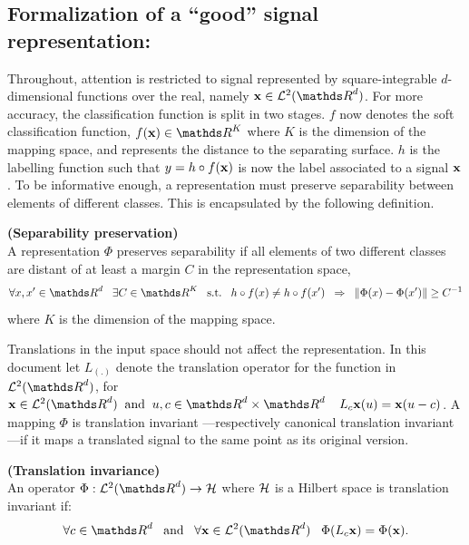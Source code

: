 \documentclass[a4paper,11pt]{report}
\begin{document}
      
		\subsection{Formalization of a ``good'' signal representation:}
      \label{sec:Intro/Signal rep/Formalization}
      
			Throughout, attention is restricted to signal represented by square-integrable $d$-dimensional functions over the real, namely $\bfx \in \mcalL^{2}(\dsR^{d})$. For more accuracy, the classification function is split in two stages. $f$ now denotes the soft classification function, \ie $f(\bfx) \in \dsR^{K}$ where $K$ is the dimension of the mapping space, and represents the distance to the separating surface. $h$ is the labelling function such that $y=h \circ f({\bf x})$ is now the label associated to a signal ${\bf x}$. To be informative enough, a representation must preserve separability between elements of different classes. This is encapsulated by the following definition.
      
			\begin{defn} \textbf{(Separability preservation)}\\
				A representation $\Phi$ preserves separability if all elements of two different classes are distant of at least a margin $C$ in the representation space,
				\begin{equation*}
					\forall x,x' \in \dsR^{d} \;\;\; \exists C \in \dsR^{K} \;\;\; \st \;\;\; h \circ f(x) \neq h \circ f(x') \;\; \Rightarrow \;\; \norm{\Phi(x)-\Phi(x')} \geq C^{-1}
				\end{equation*}
				where $K$  is the dimension of the mapping space.
				\label{def:Separability}
			\end{defn}
			
      Translations in the input space should not affect the representation. In this document let $L_{(.)}$ denote the translation operator for the function in $\mcalL^{2}(\dsR^{d})$, \ie for $\bfx \in \mcalL^{2}(\dsR^{d}) \;\; \text{and} \;\; u,c \in \dsR^{d} \times \dsR^{d} \;\;\;\; L_{c}\bfx(u) = \bfx(u-c)$. A mapping $\Phi$ is translation invariant ---respectively canonical translation invariant ---if it maps a translated signal to the same point as its original version.

      \begin{defn} \textbf{(Translation invariance)}\\ 
				An operator $\Phi: \mcalL^{2}(\dsR^{d}) \rightarrow \mcalH$ where $\mathcal{H}$ is a Hilbert space is translation invariant if:
	      	\begin{equation*}
			  		\forall c \in \dsR^{d} 
			  		\;\;\; \text{and}  \;\;\;
			  		\forall \bfx \in \mcalL^{2}(\dsR^{d}) \;\;\;
			  		\Phi(L_{c}\bfx) = \Phi(\bfx).
				\end{equation*}
				\label{def:Translation invariance - intuition}
      \end{defn}
      \vspace{-30pt}
\end{document}
